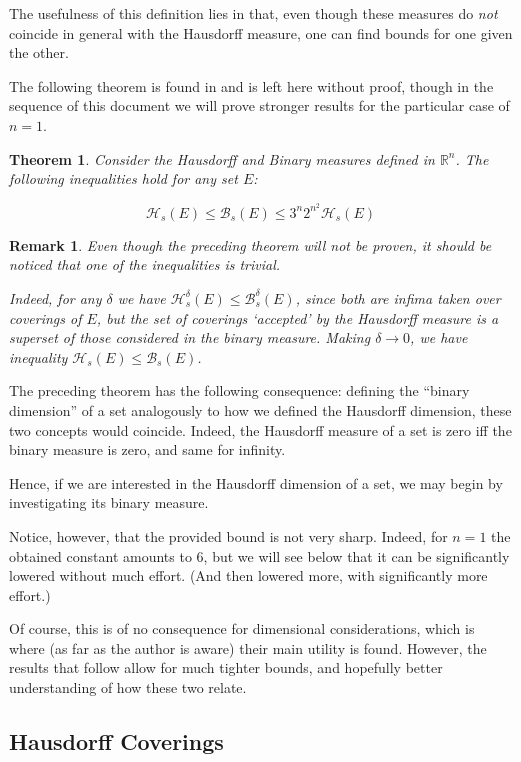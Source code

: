 \documentclass[11pt]{amsart}
\newcommand{\R}{\mathbb{R}}
\newcommand{\HH}{\mathcal{H}}
\newcommand{\BB}{\mathcal{B}}
\newtheorem{theorem}{Theorem}
\newtheorem{remark}{Remark}
\begin{document}
The usefulness of this definition lies in that, even though these measures do \emph{not} coincide in general with the Hausdorff measure, one can find bounds for one given the other.

The following theorem is found in \cite{falconer} \cite{rogers} and is left here without proof, though in the sequence of this document we will prove stronger results for the particular case of $n = 1$.

\begin{theorem}\label{badbound}
Consider the Hausdorff and Binary measures defined in $\R^n$. The following inequalities hold for any set $E$:

\[ \HH_s(E) \leq \BB_s(E) \leq 3^n 2^{n^2} \HH_s(E) \]
\end{theorem}

\begin{remark}
Even though the preceding theorem will not be proven, it should be noticed that one of the inequalities is trivial.

Indeed, for any $\delta$ we have $\HH_s^\delta(E) \leq \BB_s^\delta(E)$, since both are infima taken over coverings of $E$, but the set of coverings `accepted' by the Hausdorff measure is a superset of those considered in the binary measure. Making $\delta \to 0$, we have inequality $\HH_s(E) \leq \BB_s(E)$.
\end{remark}

The preceding theorem has the following consequence: defining the ``binary dimension'' of a set analogously to how we defined the Hausdorff dimension, these two concepts would coincide. Indeed, the Hausdorff measure of a set is zero iff the binary measure is zero, and same for infinity.

Hence, if we are interested in the Hausdorff dimension of a set, we may begin by investigating its binary measure.

Notice, however, that the provided bound is not very sharp. Indeed, for $n = 1$ the obtained constant amounts to 6, but we will see below that it can be significantly lowered without much effort. (And then lowered more, with significantly more effort.)

Of course, this is of no consequence for dimensional considerations, which is where (as far as the author is aware) their main utility is found. However, the results that follow allow for much tighter bounds, and hopefully better understanding of how these two relate.

\subsection{Hausdorff Coverings}
\end{document}
